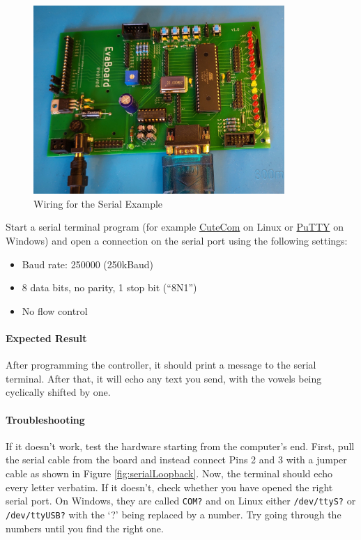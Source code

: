 \documentclass{article}
\newcommand{\file}[1]{\texttt{#1}}
\begin{document}
\begin{figure}[htb]
\centering
\includegraphics[width=0.85\textwidth]{Pictures/WiringSerial.jpg}
\caption{Wiring for the Serial Example}
\label{fig:wiringSerial}
\end{figure}

Start a serial terminal program (for example \href{https://cutecom.sourceforge.net/}{CuteCom} on Linux or \href{https://www.putty.org/}{PuTTY} on Windows) and open a connection on the serial port using the following settings:
\begin{itemize}
\item Baud rate: 250000 (250kBaud)
\item 8 data bits, no parity, 1 stop bit (``8N1'')
\item No flow control
\end{itemize}

\paragraph{Expected Result}
After programming the controller, it should print a message to the serial terminal. After that, it will echo any text you send, with the vowels being cyclically shifted by one. 

\paragraph{Troubleshooting}
If it doesn't work, test the hardware starting from the computer's end. First, pull the serial cable from the board and instead connect Pins 2 and 3 with a jumper cable as shown in Figure \ref{fig:serialLoopback}. Now, the terminal should echo every letter verbatim. If it doesn't, check whether you have opened the right serial port. On Windows, they are called \texttt{COM?} and on Linux either \file{/dev/ttyS?} or \file{/dev/ttyUSB?} with the `?' being replaced by a number. Try going through the numbers until you find the right one. 
\end{document}
